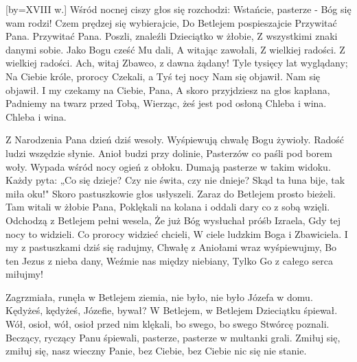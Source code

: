 \endsong
[by={XVIII w.}]
\beginverse
    Wśród nocnej ciszy głos się rozchodzi:
    Wstańcie, pasterze - Bóg się wam rodzi!
    Czem prędzej się wybierajcie,
    Do Betlejem pospieszajcie
    Przywitać Pana.
    Przywitać Pana.
\endverse
\beginverse
    Poszli, znaleźli Dzieciątko w żłobie,
    Z wszystkimi znaki danymi sobie.
    Jako Bogu cześć Mu dali,
    A witając zawołali,
    Z wielkiej radości.
    Z wielkiej radości.
\endverse
\beginverse
    Ach, witaj Zbawco, z dawna żądany!
    Tyle tysięcy lat wyglądany;
    Na Ciebie króle, prorocy
    Czekali, a Tyś tej nocy
    Nam się objawił.
    Nam się objawił.
\endverse
\beginverse
    I my czekamy na Ciebie, Pana,
    A skoro przyjdziesz na głos kapłana,
    Padniemy na twarz przed Tobą,
    Wierząc, żeś jest pod osłoną
    Chleba i wina.
    Chleba i wina.
\endverse
\endsong

\beginverse
Z Narodzenia Pana dzień dziś wesoły.
Wyśpiewują chwałę Bogu żywioły.
Radość ludzi wszędzie słynie.
Anioł budzi przy dolinie,
Pasterzów co paśli pod borem woły.
\endverse
\beginverse
Wypada wśród nocy ogień z obłoku.
Dumają pasterze w takim widoku.
Każdy pyta: „Co się dzieje?
Czy nie świta, czy nie dnieje?
Skąd ta łuna bije, tak miła oku!"
\endverse
\beginverse
Skoro pastuszkowie głos usłyszeli.
Zaraz do Betlejem prosto bieżeli.
Tam witali w żłobie Pana,
Poklękali na kolana i oddali dary co z sobą wzięli.
\endverse
\beginverse
Odchodzą z Betlejem pełni wesela,
Że już Bóg wysłuchał próśb Izraela,
Gdy tej nocy to widzieli.
Co prorocy widzieć chcieli,
W ciele ludzkim Boga i Zbawiciela.
\endverse
\beginverse
I my z pastuszkami dziś się radujmy,
Chwałę z Aniołami wraz wyśpiewujmy,
Bo ten Jezus z nieba dany,
Weźmie nas między niebiany,
Tylko Go z całego serca miłujmy!
\endverse
\endsong



\beginverse
Zagrzmiała, runęła w Betlejem ziemia,
nie było, nie było Józefa w domu.
\endverse
\beginverse
Kędyżeś, kędyżeś, Józefie, bywał?
W Betlejem, w Betlejem Dzieciątku śpiewał.
\endverse
\beginverse
Wół, osioł, wół, osioł przed nim klękali,
bo swego, bo swego Stwórcę poznali.
\endverse
\beginverse
Beczący, ryczący Panu śpiewali,
pasterze, pasterze w multanki grali.
\endverse
\beginverse
Zmiłuj się, zmiłuj się, nasz wieczny Panie,
bez Ciebie, bez Ciebie nic się nie stanie.
\endverse
\endsong

